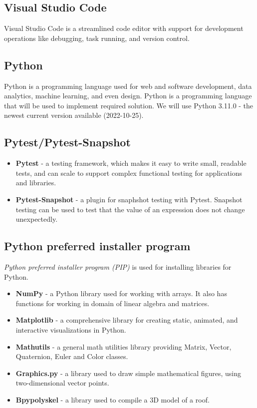 \documentclass[a4paper,12pt,fleqn]{article}
\begin{document}
\subsection{Visual Studio Code}
Visual Studio Code is a streamlined code editor with support for development operations like debugging, task running, and version control.

\subsection{Python}
Python is a programming language used for web and software development, data analytics, machine learning, and even design. Python is a programming language that will be used to implement required solution. We will use Python 3.11.0 - the newest current version available (2022-10-25).

\subsection{Pytest/Pytest-Snapshot}


\begin{itemize}
    \item \textbf{Pytest} - a testing framework, which makes it easy to write small, readable tests, and can scale to support complex functional testing for applications and libraries.
    \item \textbf{Pytest-Snapshot} - a plugin for snaphshot testing with Pytest.
    Snapshot testing can be used to test that the value of an expression does not change unexpectedly.
\end{itemize}

\subsection{Python preferred installer program}
\textit{Python preferred installer program (PIP)} is used for installing libraries for Python.
\begin{itemize}
    \item \textbf{NumPy} - a Python library used for working with arrays. It also has functions for working in domain of linear algebra and matrices.
    \item \textbf{Matplotlib} - a comprehensive library for creating static, animated, and interactive visualizations in Python.
    \item \textbf{Mathutils} - a general math utilities library providing Matrix, Vector, Quaternion, Euler and Color classes.
    \item \textbf{Graphics.py} - a library used to draw simple mathematical figures, using two-dimensional vector points.
    \item \textbf{Bpypolyskel} - a library used to compile a 3D model of a roof.
\end{itemize}
\end{document}
